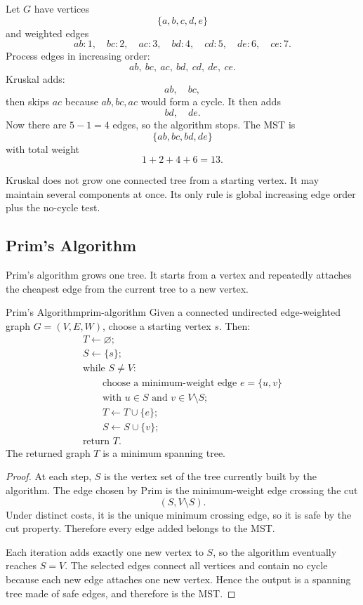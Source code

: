 \begin{examplebox}[title={Kruskal example}]
Let \(G\) have vertices
\[
\{a,b,c,d,e\}
\]
and weighted edges
\[
ab:1,\quad bc:2,\quad ac:3,\quad bd:4,\quad cd:5,\quad de:6,\quad ce:7.
\]
Process edges in increasing order:
\[
ab,\ bc,\ ac,\ bd,\ cd,\ de,\ ce.
\]
Kruskal adds:
\[
ab,\quad bc,
\]
then skips \(ac\) because \(ab,bc,ac\) would form a cycle. It then adds
\[
bd,\quad de.
\]
Now there are \(5-1=4\) edges, so the algorithm stops. The MST is
\[
\{ab,bc,bd,de\}
\]
with total weight
\[
1+2+4+6=13.
\]
\end{examplebox}

\begin{commonmistake}[title={Kruskal is not ``choose the cheapest adjacent edge''}]
Kruskal does not grow one connected tree from a starting vertex. It may maintain several components at once. Its only rule is global increasing edge order plus the no-cycle test.
\end{commonmistake}

\subsection{Prim's Algorithm}

Prim's algorithm grows one tree. It starts from a vertex and repeatedly attaches the cheapest edge from the current tree to a new vertex.

\begin{theorem}{Prim's Algorithm}{prim-algorithm}
Given a connected undirected edge-weighted graph \(G=(V,E,W)\), choose a starting vertex \(s\). Then:
\[
\begin{array}{l}
T\leftarrow \varnothing;\\
S\leftarrow \{s\};\\
\text{while }S\neq V:\\
\qquad \text{choose a minimum-weight edge }e=\{u,v\}\\
\qquad \text{with }u\in S\text{ and }v\in V\setminus S;\\
\qquad T\leftarrow T\cup\{e\};\\
\qquad S\leftarrow S\cup\{v\};\\
\text{return }T.
\end{array}
\]
The returned graph \(T\) is a minimum spanning tree.
\end{theorem}

\begin{proof}
At each step, \(S\) is the vertex set of the tree currently built by the algorithm. The edge chosen by Prim is the minimum-weight edge crossing the cut
\[
(S,V\setminus S).
\]
Under distinct costs, it is the unique minimum crossing edge, so it is safe by the cut property. Therefore every edge added belongs to the MST.

Each iteration adds exactly one new vertex to \(S\), so the algorithm eventually reaches \(S=V\). The selected edges connect all vertices and contain no cycle because each new edge attaches one new vertex. Hence the output is a spanning tree made of safe edges, and therefore is the MST.
\end{proof}

